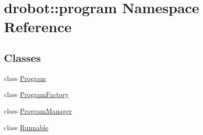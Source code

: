 \hypertarget{namespacedrobot_1_1program}{\section{drobot\-:\-:program Namespace Reference}
\label{namespacedrobot_1_1program}
}
\subsection*{Classes}
\begin{DoxyCompactItemize}
\item 
class \hyperlink{classdrobot_1_1program_1_1Program}{Program}
\item 
class \hyperlink{classdrobot_1_1program_1_1ProgramFactory}{Program\-Factory}
\item 
class \hyperlink{classdrobot_1_1program_1_1ProgramManager}{Program\-Manager}
\item 
class \hyperlink{classdrobot_1_1program_1_1Runnable}{Runnable}
\end{DoxyCompactItemize}
